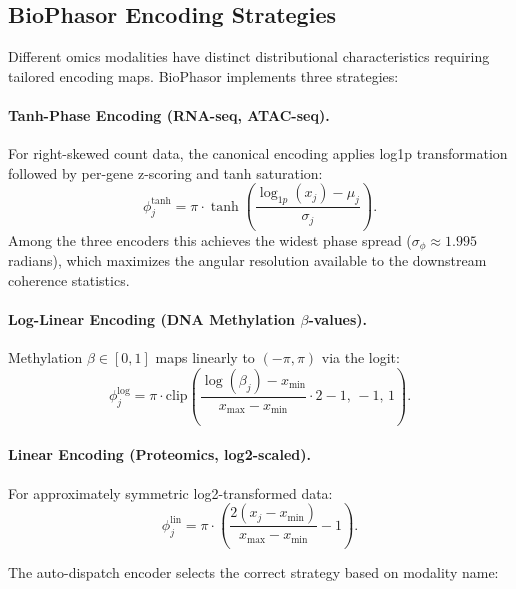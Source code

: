 \documentclass[preprint,12pt,amsmath,amssymb,superscriptaddress,floatfix]{revtex4-2}
\begin{document}
\subsection{BioPhasor Encoding Strategies}
\label{subsec:biophasor_encoding}

Different omics modalities have distinct distributional characteristics
requiring tailored encoding maps.
BioPhasor implements three strategies:

\paragraph{Tanh-Phase Encoding (RNA-seq, ATAC-seq).}
For right-skewed count data, the canonical encoding applies log1p
transformation followed by per-gene z-scoring and tanh saturation:
\begin{equation}
    \phi_j^{\mathrm{tanh}} = \pi \cdot
    \tanh\!\left(\frac{\log_{1p}(x_j) - \mu_j}{\sigma_j}\right).
\end{equation}
Among the three encoders this achieves the widest phase spread
($\sigma_\phi \approx 1.995$ radians), which maximizes the angular
resolution available to the downstream coherence statistics.

\paragraph{Log-Linear Encoding (DNA Methylation $\beta$-values).}
Methylation $\beta \in [0,1]$ maps linearly to $(-\pi,\pi)$ via the logit:
\begin{equation}
    \phi_j^{\mathrm{log}} = \pi \cdot
    \mathrm{clip}\!\left(\frac{\log(\beta_j) - x_{\min}}{x_{\max} - x_{\min}}
    \cdot 2 - 1,\,-1,\,1\right).
\end{equation}

\paragraph{Linear Encoding (Proteomics, log2-scaled).}
For approximately symmetric log2-transformed data:
\begin{equation}
    \phi_j^{\mathrm{lin}} = \pi \cdot
    \left(\frac{2(x_j - x_{\min})}{x_{\max} - x_{\min}} - 1\right).
\end{equation}

\noindent
The auto-dispatch encoder selects the correct
strategy based on modality name:


\end{document}
